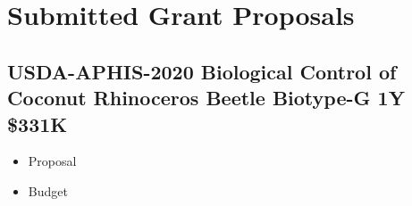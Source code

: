 \begin{comment}
\begin{tabular}{>{\raggedright}p{2in}>{\raggedright}p{2in}>{\centering}p{0.5in}>{\raggedleft}p{1in}}
\hline 
\textbf{Funding Source} & \textbf{Title} & \textbf{Years} & \textbf{Budget}\tabularnewline
\hline 
\textbf{Active} &  &  & \tabularnewline
\hline 
Farm Bill 2017 moore2017farmbill & Biological Control of Coconut Rhinoceros Beetle Biotype-G & 1 & \$200,000\tabularnewline
\hline 
Farm Bill 2018 moore2018farmbill & Biological Control of Coconut Rhinoceros Beetle Biotype-G & 1 & \$200,000\tabularnewline
\hline 
Department of the Interior - Office of Insular Affairs

moore2017doiproposal & Biological Control of Coconut Rhinoceros Beetle Biotype-G in Micronesia & 2 & \$176,553\tabularnewline
\hline 
McIntire-Stennis moore2018mcintirestennis2  & Guam Forest Insect Survey & 4 & \$40,000\tabularnewline
\hline 
National Plant Diagnostic Network 2017 moore2018university moore2018npdnaccomplishments &  & 1 & \$10,000\tabularnewline
\hline 
\textbf{Pending} &  &  & \tabularnewline
\hline 
Farm Bill 2019

\cite{moore_fy19_2018,moore_fy19_2018-1} & Biological Control of Coconut Rhinoceros Beetle Biotype-G & 1 & \$282,044\tabularnewline
\hline 
McIntire-Stennis moore2018mcintirestennis &  & 5 & \$80,000\tabularnewline
\hline 
National Plant Diagnostic Network &  & 1 & \$10,000\tabularnewline
\hline 
\end{tabular}
\end{comment}

\section{Submitted Grant Proposals}

\subsection{USDA-APHIS-2020 Biological Control of Coconut Rhinoceros Beetle Biotype-G 1Y \$331K}
\label{USDA-APHIS-2020}
\begin{refsection}
	\begin{itemize}
		\item Proposal \cite{moore_fy20_2019}
		\item Budget \cite{moore_fy20_2019-1} 
	\end{itemize}	
	\printbibliography[heading=none]
\end{refsection}

